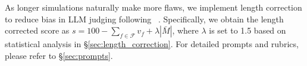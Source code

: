 As longer simulations naturally make more flaws, we implement length correction to reduce bias in LLM judging following ~\citet{dubois2024alpacaeval}. 
Specifically, we obtain the length corrected score as 
$s = 100-\sum_{f\in\mathcal{F}}v_f + \lambda|\bar{M}|$, 
where $\lambda$ is set to 1.5 based on statistical analysis in \S\ref{sec:length_correction}. 
For detailed prompts and rubrics, please refer to \S\ref{sec:prompts}.
